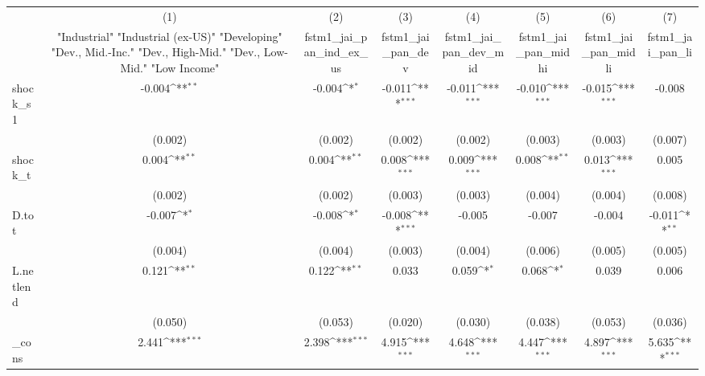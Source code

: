 {
\def\sym#1{\ifmmode^{#1}\else\(^{#1}\)\fi}
\begin{tabular}{l*{7}{c}}
\toprule
            &\multicolumn{1}{c}{(1)}&\multicolumn{1}{c}{(2)}&\multicolumn{1}{c}{(3)}&\multicolumn{1}{c}{(4)}&\multicolumn{1}{c}{(5)}&\multicolumn{1}{c}{(6)}&\multicolumn{1}{c}{(7)}\\
            &\multicolumn{1}{c}{ "Industrial" "Industrial (ex-US)" "Developing" "Dev., Mid.-Inc." "Dev., High-Mid."  "Dev., Low-Mid." "Low Income" }&\multicolumn{1}{c}{fstm1\_jai\_pan\_ind\_ex\_us}&\multicolumn{1}{c}{fstm1\_jai\_pan\_dev}&\multicolumn{1}{c}{fstm1\_jai\_pan\_dev\_mid}&\multicolumn{1}{c}{fstm1\_jai\_pan\_midhi}&\multicolumn{1}{c}{fstm1\_jai\_pan\_midli}&\multicolumn{1}{c}{fstm1\_jai\_pan\_li}\\
\midrule
shock\_s1    &      -0.004\sym{**} &      -0.004\sym{*}  &      -0.011\sym{***}&      -0.011\sym{***}&      -0.010\sym{***}&      -0.015\sym{***}&      -0.008         \\
            &     (0.002)         &     (0.002)         &     (0.002)         &     (0.002)         &     (0.003)         &     (0.003)         &     (0.007)         \\
\addlinespace
shock\_t     &       0.004\sym{**} &       0.004\sym{**} &       0.008\sym{***}&       0.009\sym{***}&       0.008\sym{**} &       0.013\sym{***}&       0.005         \\
            &     (0.002)         &     (0.002)         &     (0.003)         &     (0.003)         &     (0.004)         &     (0.004)         &     (0.008)         \\
\addlinespace
D.tot       &      -0.007\sym{*}  &      -0.008\sym{*}  &      -0.008\sym{***}&      -0.005         &      -0.007         &      -0.004         &      -0.011\sym{**} \\
            &     (0.004)         &     (0.004)         &     (0.003)         &     (0.004)         &     (0.006)         &     (0.005)         &     (0.005)         \\
\addlinespace
L.netlend   &       0.121\sym{**} &       0.122\sym{**} &       0.033         &       0.059\sym{*}  &       0.068\sym{*}  &       0.039         &       0.006         \\
            &     (0.050)         &     (0.053)         &     (0.020)         &     (0.030)         &     (0.038)         &     (0.053)         &     (0.036)         \\
\addlinespace
\_cons      &       2.441\sym{***}&       2.398\sym{***}&       4.915\sym{***}&       4.648\sym{***}&       4.447\sym{***}&       4.897\sym{***}&       5.635\sym{***}\\

\end{tabular}}
